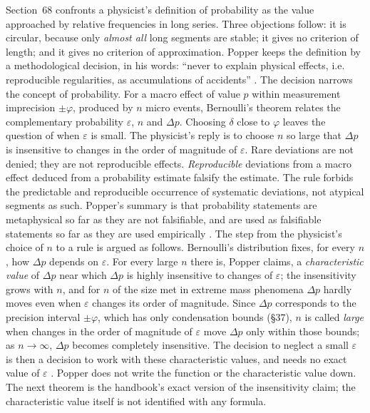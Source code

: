 Section~68 confronts a physicist's definition of probability as the
value approached by relative frequencies in long series. Three objections
follow: it is circular, because only \emph{almost all} long segments
are stable; it gives no criterion of length; and it gives no criterion
of approximation. Popper keeps the definition by a methodological
decision, in his words: ``never to explain physical effects, i.e.
reproducible regularities, as accumulations of accidents''
\parencite[\S68]{Popper2002LogicDiscoveryUI}. The decision narrows the
concept of probability. For a macro effect of value \(p\) within measurement
imprecision \(\pm\varphi\), produced by \(n\) micro events, Bernoulli's
theorem relates the complementary probability \(\varepsilon\), \(n\) and
\(\Delta p\). Choosing \(\delta\) close to \(\varphi\) leaves the
question of when \(\varepsilon\) is small. The physicist's reply is to
choose \(n\) so large that \(\Delta p\) is insensitive to changes in the
order of magnitude of \(\varepsilon\). Rare deviations are not denied;
they are not reproducible effects. \emph{Reproducible} deviations from a
macro effect deduced from a probability estimate falsify the estimate.
The rule forbids the predictable and reproducible occurrence of
systematic deviations, not atypical segments as such. Popper's summary
is that probability statements are metaphysical so far as they are not
falsifiable, and are used as falsifiable statements so far as they are
used empirically \parencite[\S68]{Popper2002LogicDiscoveryUI}.
The step from the physicist's choice of \(n\) to a rule is argued as
follows. Bernoulli's distribution fixes, for every \(n\), how \(\Delta p\)
depends on \(\varepsilon\). For every large \(n\) there is, Popper
claims, a \emph{characteristic value} of \(\Delta p\) near which
\(\Delta p\) is highly insensitive to changes of \(\varepsilon\); the
insensitivity grows with \(n\), and for \(n\) of the size met in extreme
mass phenomena \(\Delta p\) hardly moves even when \(\varepsilon\) changes
its order of magnitude. Since \(\Delta p\) corresponds to the precision
interval \(\pm\varphi\), which has only condensation bounds (\S37),
\(n\) is called \emph{large} when changes in the order of magnitude of
\(\varepsilon\) move \(\Delta p\) only within those bounds; as
\(n\to\infty\), \(\Delta p\) becomes completely insensitive. The decision
to neglect a small \(\varepsilon\) is then a decision to work with these
characteristic values, and needs no exact value of \(\varepsilon\)
\parencite[\S68, pp.~194--195]{Popper2002LogicDiscoveryUI}. Popper does
not write the function or the characteristic value down. The next theorem
is the handbook's exact version of the insensitivity claim; the
characteristic value itself is not identified with any formula.

